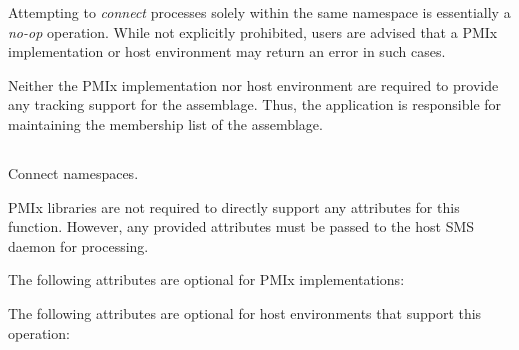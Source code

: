 \adviceuserstart
Attempting to \textit{connect} processes solely within the same namespace is essentially a \textit{no-op} operation. While not explicitly prohibited, users are advised that a \ac{PMIx} implementation or host environment may return an error in such cases.

Neither the \ac{PMIx} implementation nor host environment are required to provide any tracking support for the assemblage. Thus, the application is responsible for maintaining the membership list of the assemblage.
\adviceuserend


\subsection{}

\summary

Connect namespaces.

\format


\begin{arglist}
\end{arglist}

\returnsimple

\reqattrstart
\ac{PMIx} libraries are not required to directly support any attributes for this function. However, any provided attributes must be passed to the host \ac{SMS} daemon for processing.

\reqattrend

\optattrstart
The following attributes are optional for \ac{PMIx} implementations:



The following attributes are optional for host environments that support this operation:


\optattrend

